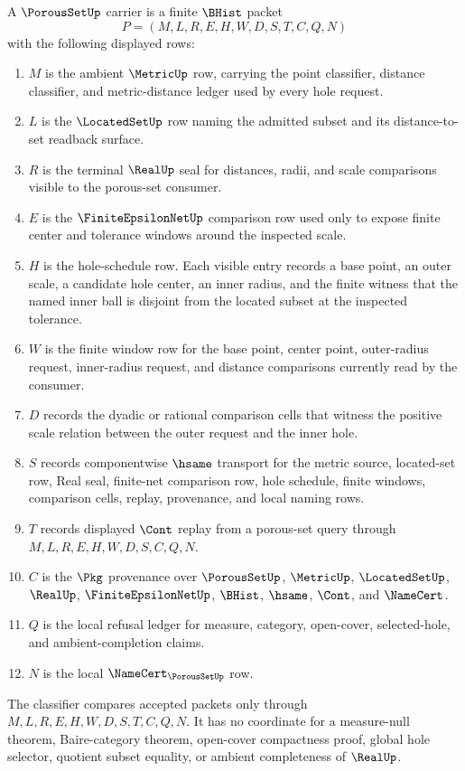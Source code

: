 \begin{definition}
\label{def:porous-set-carrier}
A $\PorousSetUp$ carrier is a finite $\BHist$ packet
$$
P=(M,L,R,E,H,W,D,S,T,C,Q,N)
$$
with the following displayed rows:
\begin{enumerate}
\item $M$ is the ambient $\MetricUp$ row, carrying the point classifier, distance classifier, and metric-distance ledger used by every hole request.
\item $L$ is the $\LocatedSetUp$ row naming the admitted subset and its distance-to-set readback surface.
\item $R$ is the terminal $\RealUp$ seal for distances, radii, and scale comparisons visible to the porous-set consumer.
\item $E$ is the $\FiniteEpsilonNetUp$ comparison row used only to expose finite center and tolerance windows around the inspected scale.
\item $H$ is the hole-schedule row. Each visible entry records a base point, an outer scale, a candidate hole center, an inner radius, and the finite witness that the named inner ball is disjoint from the located subset at the inspected tolerance.
\item $W$ is the finite window row for the base point, center point, outer-radius request, inner-radius request, and distance comparisons currently read by the consumer.
\item $D$ records the dyadic or rational comparison cells that witness the positive scale relation between the outer request and the inner hole.
\item $S$ records componentwise $\hsame$ transport for the metric source, located-set row, Real seal, finite-net comparison row, hole schedule, finite windows, comparison cells, replay, provenance, and local naming rows.
\item $T$ records displayed $\Cont$ replay from a porous-set query through $M,L,R,E,H,W,D,S,C,Q,N$.
\item $C$ is the $\Pkg$ provenance over $\PorousSetUp$, $\MetricUp$, $\LocatedSetUp$, $\RealUp$, $\FiniteEpsilonNetUp$, $\BHist$, $\hsame$, $\Cont$, and $\NameCert$.
\item $Q$ is the local refusal ledger for measure, category, open-cover, selected-hole, and ambient-completion claims.
\item $N$ is the local $\NameCert_{\PorousSetUp}$ row.
\end{enumerate}
The classifier compares accepted packets only through $M,L,R,E,H,W,D,S,T,C,Q,N$. It has no coordinate for a measure-null theorem, Baire-category theorem, open-cover compactness proof, global hole selector, quotient subset equality, or ambient completeness of $\RealUp$.
\end{definition}

